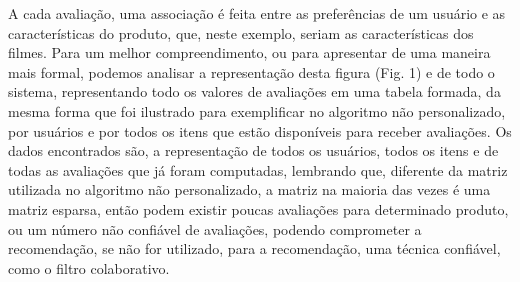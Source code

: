 \documentclass[12pt,
				openright,
				twoside,
				a4paper,
				apter=TITLE,
				section=TITLE,
				subsection=TITLE,
				chapter=TITLE,
				english,
				brazil]{abntex2}
\newcommand{\mc}[3]{\multicolumn{#1}{#2}{#3}}
\begin{document}
A cada avaliação, uma associação é feita entre as preferências de um usuário e as características do produto, que, neste exemplo, seriam as características dos filmes. Para um melhor compreendimento, ou para apresentar de uma maneira mais formal, podemos analisar a representação desta figura (Fig. 1) e de todo o sistema, representando todo os valores de avaliações em uma tabela formada, da mesma forma que foi ilustrado para exemplificar no algoritmo não personalizado, por usuários e por todos os itens que estão disponíveis para receber avaliações. Os dados encontrados são, a representação de todos os usuários, todos os itens e de todas as avaliações que já foram computadas, lembrando que, diferente da matriz utilizada no algoritmo não personalizado, a matriz na maioria das vezes é uma matriz esparsa, então podem existir poucas avaliações para determinado produto, ou um número não confiável de avaliações, podendo comprometer a recomendação, se não for utilizado, para a recomendação, uma técnica confiável, como o filtro colaborativo.


\end{document}
